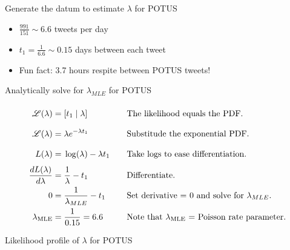 \documentclass[ignorenonframetext,]{beamer}
\begin{document}
\begin{frame}{Generate the datum to estimate \(\lambda\) for POTUS}

\begin{itemize}
\item
  \(\frac{991}{151} \sim 6.6\) tweets per day
\item
  \(t_{1} = \frac{1}{6.6} \sim 0.15\) days between each tweet
\item
  Fun fact: 3.7 hours respite between POTUS tweets!
\end{itemize}

\end{frame}

\begin{frame}{Analytically solve for \(\lambda_{MLE}\) for POTUS}

\begin{alignat*}{3}
\mathscr{L}(\lambda) & =  \vphantom{\frac11}[t_{1} \mid \lambda] &&\quad\text{The likelihood equals the PDF.}\\
\mathscr{L}(\lambda) & =  \vphantom{\frac11}\lambda e^{-\lambda t_{1}}&&\quad\text{Substitude the exponential PDF.}\\
L(\lambda) & =  \vphantom{\frac11}\log(\lambda)-\lambda{t_{1}}&&\quad\text{Take logs to ease differentiation.}\\
\frac{dL(\lambda)}{d\lambda} & = \frac{1}{\lambda}-{t_{1}}&&\quad\text{Differentiate.}\\
0 & = \frac{1}{\lambda_{MLE}}-{t_{1}}&&\quad\text{Set derivative = 0 and solve for $\lambda_{MLE}$.}\\
\lambda_{\textrm{MLE}} & =\frac{1}{{0.15}}= 6.6 &&\quad\text{Note that $\lambda_{\textrm{MLE}}$ = Poisson rate parameter.}
\end{alignat*}

\end{frame}

\begin{frame}{Likelihood profile of \(\lambda\) for POTUS}

\begin{center}

\end{center}

\end{frame}
\end{document}
